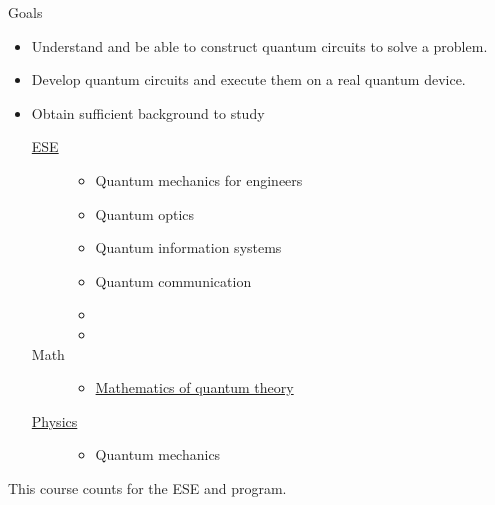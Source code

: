 \begin{frame}{Goals}
\begin{itemize}
    \item Understand and be able to construct quantum circuits to solve a problem.
    \item Develop quantum circuits and execute them on a real quantum device.
    \item Obtain sufficient background to study
    \begin{description}
        \item[\href{https://ese.wustl.edu/index.html}{ESE}] 
        \begin{itemize}
            \item Quantum mechanics for engineers
            \item Quantum optics
            \item Quantum information systems
            \item Quantum communication
            \item {} 
            \item {} 
        \end{itemize}
        \item [Math]
        \begin{itemize}
            \item \href{https://www.math.wustl.edu/~feres/Math528Spring19/Math528Spring19Syllabus.html}{Mathematics of quantum theory}
        \end{itemize}
        \item[\href{https://physics.wustl.edu/}{Physics}]
        \begin{itemize}
            \item Quantum mechanics
        \end{itemize}
    \end{description} 
\end{itemize}
This course counts for the ESE  and  program.
\end{frame}

